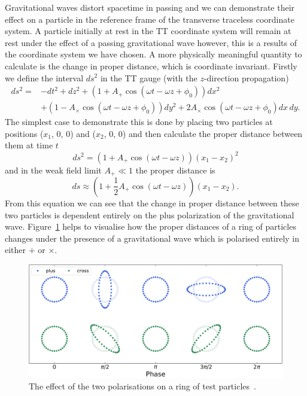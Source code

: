 Gravitational waves distort spacetime in passing and we can demonstrate their effect on a particle in the reference frame of the transverse traceless coordinate system. A particle initially at rest in the TT coordinate system will remain at rest under the effect of a passing gravitational wave however, this is a results of the coordinate system we have chosen. A more physically meaningful quantity to calculate is the change in proper distance, which is coordinate invariant. Firstly we define the interval $ds^{2}$ in the TT gauge (with the $z$-direction propagation)
%
\begin{equation}
\begin{split}
    ds^{2} = & -dt^{2} + dz^{2} + \left(1 + A_{+}\cos(\omega t - \omega z + \phi_{0})\right) dx^{2} \\
    & + \left(1 - A_{\times} \cos(\omega t - \omega z + \phi_{0})\right) dy^{2} 
    + 2 A_{\times}\cos(\omega t - \omega z + \phi_{0}) dx\,dy .
\end{split}
\end{equation}
%
The simplest case to demonstrate this is done by placing two particles at positions ($x_{1}$, $0$, $0$) and ($x_{2}$, $0$, 0)  and then calculate the proper distance between them at time $t$
%
\begin{equation}
    ds^{2} = \left(1 + A_{+} \cos(\omega t - \omega z)\right)(x_{1} - x_{2})^{2}
\end{equation}
%
and in the weak field limit $A_{+} \ll 1$ the proper distance is
%
\begin{equation}
    ds \approx \left(1 + \frac{1}{2} A_{+} \cos(\omega t - \omega z)\right)(x_{1} - x_{2}) .
\end{equation}
%
From this equation we can see that the change in proper distance between these two particles is dependent entirely on the plus polarization of the gravitational wave. Figure~\ref{1:fig:ring_of_particles} helps to visualise how the proper distances of a ring of particles changes under the presence of a gravitational wave which is polarised entirely in either $+$ or $\times$.
%
\begin{figure}
   \includegraphics[width=\textwidth]{images/1_general_relativity/polarization.png}
   \caption{The effect of the two polarisations on a ring of test particles~\cite{gw_polarization_plots}.}
   \label{1:fig:ring_of_particles}
\end{figure}
%

